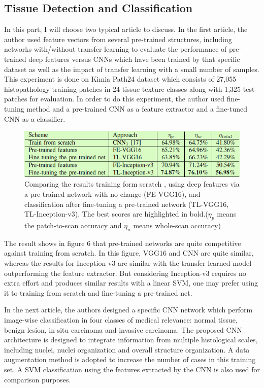 \documentclass[10pt,twocolumn,letterpaper]{article}
\begin{document}
\subsection{Tissue Detection and Classification}

In this part, I will choose two typical article to discuss. In the first article\cite{kieffer2017convolutional}, the author used feature vectors from several pre-trained structures, including networks with/without transfer learning to evaluate the performance of pre-trained deep features versus CNNs which have been trained by that specific dataset as well as the impact of transfer learning with a small number of samples. This experiment is done on Kimia Path24 dataset which consists of 27,055 histopathology training patches in 24 tissue texture classes along with 1,325 test patches for evaluation. In order to do this experiment, the author used fine-tuning method and a pre-trained CNN as a feature extractor and a fine-tuned CNN as a classifier.

\begin{figure}[t]
	\begin{center}
		\includegraphics[width=0.8\linewidth]{Pic/12.png}
	\end{center}
	\caption{Comparing the results training form scratch , using deep features via a pre-trained network with no change (FE-VGG16), and classification after fine-tuning a pre-trained network (TL-VGG16, TL-Inception-v3). The best scores are highlighted in bold.(\textit{$\eta_p$} means the patch-to-scan accuracy and \textit{$\eta_n$} means whole-scan accuracy)}
	\label{fig:long}
	\label{fig:onecol}
\end{figure}

The result shows in figure 6 that pre-trained networks are quite competitive against training from scratch. In this figure, VGG16 and CNN are quite similar, whereas the results for Inception-v3 are similar with the transfer-learned model outperforming the feature extractor. But considering Inception-v3 requires no extra effort and produces similar results with a linear SVM, one may prefer using it to training from scratch and fine-tuning a pre-trained net.

In the next article\cite{araujo2017classification}, the authors designed a specific CNN network which perform image-wise classification in four classes of medical relevance: normal tissue, benign lesion, in situ carcinoma and invasive carcinoma. The proposed CNN architecture is designed to integrate information from multiple histological scales, including nuclei, nuclei organization and overall structure organization. A data augmentation method is adopted to increase the number of cases in this training set. A SVM classification using the features extracted by the CNN is also used for comparison purposes.
\end{document}
